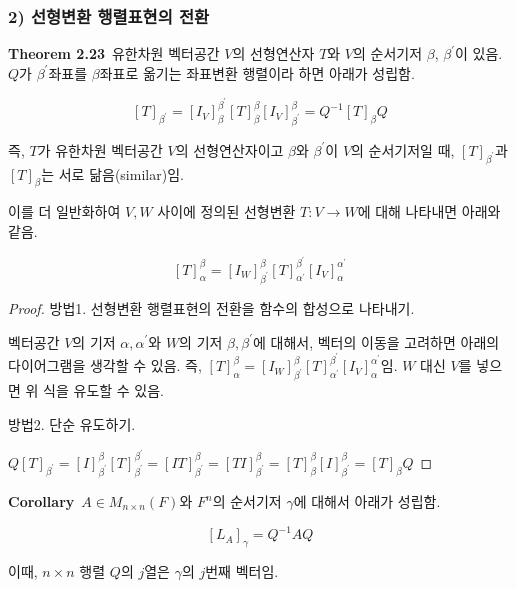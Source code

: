 \subsubsection*{2) 선형변환 행렬표현의 전환}
\textbf{Theorem 2.23}\, 유한차원 벡터공간 $V$의 선형연산자 $T$와 $V$의 순서기저 $\beta$, $\beta^{\prime}$이 있음. $Q$가 $\beta^{\prime}$좌표를 $\beta$좌표로 옮기는 좌표변환 행렬이라 하면 아래가 성립함.

\[
[T]_{\beta^{\prime}}=[I_V]_{\beta}^{\beta^\prime}[T]^{\beta}_{\beta}[I_V]_{\beta^{\prime}}^{\beta}=Q^{-1}[T]_{\beta}Q
\]

즉, $T$가 유한차원 벡터공간 $V$의 선형연산자이고 $\beta$와 $\beta^{\prime}$이 $V$의 순서기저일 때, $[T]_{\beta^{\prime}}$과 $[T]_{\beta}$는 서로 닮음(similar)임.

이를 더 일반화하여 $V,W$ 사이에 정의된 선형변환 $T:V \rightarrow W$에 대해 나타내면 아래와 같음.

\[
[T]_{\alpha}^{\beta}=[I_W]_{\beta^\prime}^{\beta}[T]_{\alpha^{\prime}}^{\beta^{\prime}}[I_V]_{\alpha}^{\alpha^{\prime}}
\]

\begin{proof}
방법1. 선형변환 행렬표현의 전환을 함수의 합성으로 나타내기.

벡터공간 $V$의 기저 $\alpha, \alpha^{\prime}$와 $W$의 기저 $\beta, \beta^{\prime}$에 대해서, 벡터의 이동을 고려하면 아래의 다이어그램을 생각할 수 있음. 즉, $[T]_{\alpha}^{\beta}=[I_W]_{\beta^\prime}^{\beta}[T]_{\alpha^{\prime}}^{\beta^{\prime}}[I_V]_{\alpha}^{\alpha^{\prime}}$임. $W$ 대신 $V$를 넣으면 위 식을 유도할 수 있음.


방법2. 단순 유도하기.

$Q[T]_{\beta^{\prime}}=[I]_{\beta^{\prime}}^{\beta}[T]_{\beta^{\prime}}^{\beta^{\prime}}=[IT]_{\beta^{\prime}}^{\beta}=[TI]_{\beta^{\prime}}^{\beta}=[T]_{\beta}^{\beta}[I]_{\beta^{\prime}}^{\beta}=[T]_{\beta}Q$
\end{proof}

\textbf{Corollary}\, $A \in M_{n \times n}(F)$와 $F^n$의 순서기저 $\gamma$에 대해서 아래가 성립함.

\[
[L_A]_{\gamma}=Q^{-1}AQ
\]

이때, $n \times n$ 행렬 $Q$의 $j$열은 $\gamma$의 $j$번째 벡터임.


\newpage
